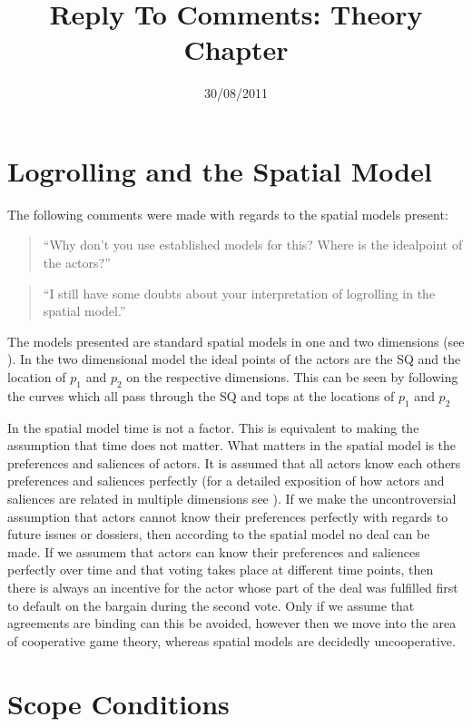 \documentclass{article}
\title{Reply To Comments: Theory Chapter}
\date{30/08/2011}
\begin{document}
\maketitle

\section{Logrolling and the Spatial Model}

The following comments were made with regards to the spatial models present:

\begin{quote}
  ``Why don't you use established models for this? Where is the idealpoint of the actors?''
\end{quote}

\begin{quote}
  ``I still have some doubts about your interpretation of logrolling in the spatial model.''
\end{quote}

The models presented are standard spatial models in one and two dimensions (see \citealt{HinichMunger1997}). In the two dimensional model the ideal points of the actors are the SQ and the location of $p_1$ and $p_2$ on the respective dimensions. This can be seen by following the curves which all pass through the SQ and tops at the locations of $p_1$ and $p_2$

In the spatial model time is not a factor. This is equivalent to  making the assumption that time does not matter. What matters in the spatial model is the preferences and saliences of actors. It is assumed that all actors know each others preferences and saliences perfectly (for a detailed exposition of how actors and saliences are related in multiple dimensions see \citealt[chapters 3 and 4]{HinichMunger1997}). If we make the uncontroversial assumption that actors cannot know their preferences perfectly with regards to future issues or dossiers, then according to the spatial model no deal can be made. If we assumem that actors can know their preferences and saliences perfectly over time and that voting takes place at different time points, then there is always an incentive for the actor whose part of the deal was fulfilled first to default on the bargain during the second vote. Only if we assume that agreements are binding can this be avoided, however then we move into the area of cooperative game theory, whereas spatial models are decidedly uncooperative. 

\section{Scope Conditions}
\end{document}
